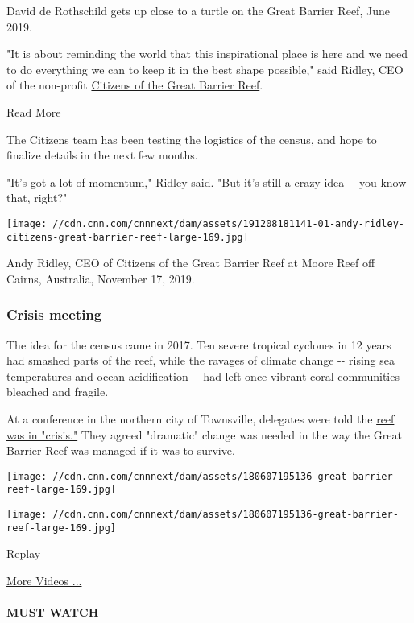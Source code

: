 David de Rothschild gets up close to a turtle on the Great Barrier Reef,
June 2019.

"It is about reminding the world that this inspirational place is here
and we need to do everything we can to keep it in the best shape
possible," said Ridley, CEO of the non-profit
\href{https://citizensgbr.org/}{Citizens of the Great Barrier Reef}.

Read More

The Citizens team has been testing the logistics of the census, and hope
to finalize details in the next few months.

"It's got a lot of momentum," Ridley said. "But it's still a crazy idea
-\/- you know that, right?"

\texttt{[image: //cdn.cnn.com/cnnnext/dam/assets/191208181141-01-andy-ridley-citizens-great-barrier-reef-large-169.jpg]}

Andy Ridley, CEO of Citizens of the Great Barrier Reef at Moore Reef off
Cairns, Australia, November 17, 2019.

\hypertarget{crisis-meeting}{%
\subsubsection{Crisis meeting}\label{crisis-meeting}}

The idea for the census came in 2017. Ten severe tropical cyclones in 12
years had smashed parts of the reef, while the ravages of climate change
-\/- rising sea temperatures and ocean acidification -\/- had left once
vibrant coral communities bleached and fragile.

At a conference in the northern city of Townsville, delegates were told
the
\href{http://elibrary.gbrmpa.gov.au/jspui/bitstream/11017/3203/1/GBR-Summit-proceedings-and-outputs-report.pdf}{reef
was in "crisis."} They agreed "dramatic" change was needed in the way
the Great Barrier Reef was managed if it was to survive.

\texttt{[image: //cdn.cnn.com/cnnnext/dam/assets/180607195136-great-barrier-reef-large-169.jpg]}

\texttt{[image: //cdn.cnn.com/cnnnext/dam/assets/180607195136-great-barrier-reef-large-169.jpg]}\href{javascript:void(0);}{}

Replay

\href{/videos}{More Videos ...}

\hypertarget{must-watch}{%
\paragraph{MUST WATCH}\label{must-watch}}

